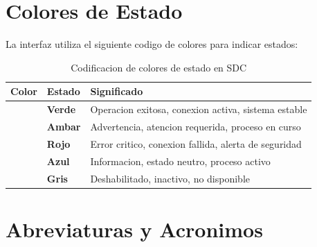 \section*{Colores de Estado}

La interfaz utiliza el siguiente codigo de colores para indicar estados:

\begin{table}[H]
\centering
\begin{tabular}{>{\centering\arraybackslash}p{3cm}p{3cm}p{6cm}}
\toprule
\textbf{Color} & \textbf{Estado} & \textbf{Significado} \\
\midrule
\cellcolor{sandraGreen} & \textbf{Verde} & Operacion exitosa, conexion activa, sistema estable \\
\midrule
\cellcolor{sandraAccent} & \textbf{Ambar} & Advertencia, atencion requerida, proceso en curso \\
\midrule
\cellcolor{red!70} & \textbf{Rojo} & Error critico, conexion fallida, alerta de seguridad \\
\midrule
\cellcolor{blue!50} & \textbf{Azul} & Informacion, estado neutro, proceso activo \\
\midrule
\cellcolor{gray!50} & \textbf{Gris} & Deshabilitado, inactivo, no disponible \\
\bottomrule
\end{tabular}
\caption{Codificacion de colores de estado en SDC}
\label{tab:colores-estado}
\end{table}

\section*{Abreviaturas y Acronimos}

